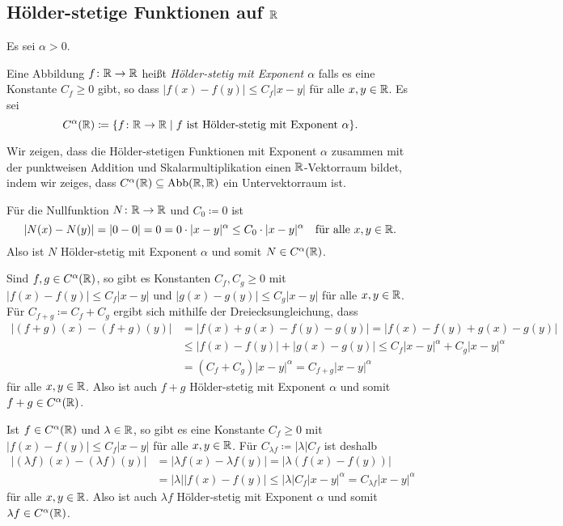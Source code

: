 \subsection{Hölder-stetige Funktionen auf \texorpdfstring{$\mathbb{R}$}{R}}
Es sei $\alpha > 0$.

\begin{defi}
 Eine Abbildung $f \colon \mathbb{R} \to \mathbb{R}$ heißt \emph{Hölder-stetig mit Exponent $\alpha$} falls es eine Konstante $C_f \geq 0$ gibt, so dass $|f(x)-f(y)| \leq C_f |x-y|$ für alle $x,y \in \mathbb{R}$. Es sei
 \[
  C^\alpha(\mathbb{R})
  \coloneqq \{f \colon \mathbb{R} \to \mathbb{R} \mid \text{$f$ ist Hölder-stetig mit Exponent $\alpha$}\}.
 \]
\end{defi}

Wir zeigen, dass die Hölder-stetigen Funktionen mit Exponent $\alpha$ zusammen mit der punktweisen Addition und Skalarmultiplikation einen $\mathbb{R}$-Vektorraum bildet, indem wir zeiges, dass $C^\alpha(\mathbb{R}) \subseteq \mathrm{Abb}(\mathbb{R},\mathbb{R})$ ein Untervektorraum ist.

Für die Nullfunktion $N \colon \mathbb{R} \to \mathbb{R}$ und $C_0 \coloneqq 0$ ist
\[
 |N(x) - N(y)|
 = |0 - 0|
 = 0
 = 0 \cdot |x-y|^\alpha
 \leq C_0 \cdot |x-y|^\alpha
 \quad
 \text{für alle $x,y \in \mathbb{R}$}.
\]
Also ist $N$ Hölder-stetig mit Exponent $\alpha$ und somit $N \in C^\alpha(\mathbb{R})$.

Sind $f,g \in C^\alpha(\mathbb{R})$, so gibt es Konstanten $C_f, C_g \geq 0$ mit $|f(x)-f(y)| \leq C_f |x-y|$ und $|g(x)-g(y)| \leq C_g |x-y|$ für alle $x,y \in \mathbb{R}$. Für $C_{f+g} \coloneqq C_f + C_g$ ergibt sich mithilfe der Dreiecksungleichung, dass
\begin{align*}
 |(f+g)(x) - (f+g)(y)|
 &= |f(x)+g(x)-f(y)-g(y)|
 = |f(x)-f(y) + g(x)-g(y)| \\
 &\leq |f(x)-f(y)| + |g(x)-g(y)|
 \leq C_f |x-y|^\alpha + C_g |x-y|^\alpha \\
 &= (C_f + C_g) |x-y|^\alpha
 = C_{f+g} |x-y|^\alpha
\end{align*}
für alle $x,y \in \mathbb{R}$. Also ist auch $f+g$ Hölder-stetig mit Exponent $\alpha$ und somit $f+g \in C^\alpha(\mathbb{R})$.

Ist $f \in C^\alpha(\mathbb{R})$ und $\lambda \in \mathbb{R}$, so gibt es eine Konstante $C_f \geq 0$ mit $|f(x)-f(y)| \leq C_f |x-y|$ für alle $x,y \in \mathbb{R}$. Für $C_{\lambda f} \coloneqq |\lambda| C_f$ ist deshalb
\begin{align*}
 |(\lambda f)(x) - (\lambda f)(y)|
 &= |\lambda f(x) - \lambda f(y)|
 = |\lambda (f(x) - f(y))| \\
 &= |\lambda| |f(x)-f(y)|
 \leq |\lambda| C_f |x-y|^\alpha
 = C_{\lambda f} |x-y|^\alpha
\end{align*}
für alle $x,y \in \mathbb{R}$. Also ist auch $\lambda f$ Hölder-stetig mit Exponent $\alpha$ und somit $\lambda f \in C^\alpha(\mathbb{R})$.

